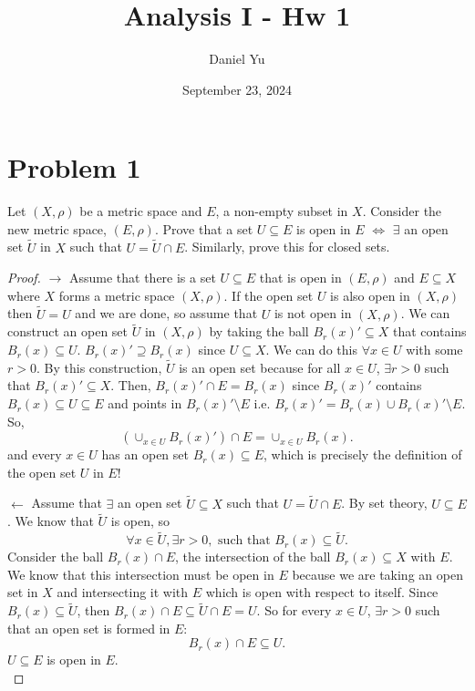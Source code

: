 \documentclass[a4paper]{article}
\title{\Huge{Analysis I - Hw 1}}
\author{\huge{Daniel Yu}}
\date{September 23, 2024}
\begin{document}
\maketitle
\newpage%
\pagebreak

\section{Problem 1}
Let $(X,\rho)$ be a metric space and  $E$, a non-empty subset in $X$. Consider the new metric space,
$(E,\rho)$. Prove that a set $U \subseteq E$ is open in $E$ $\iff$ $\exists $ an open set $\tilde{U}$ in $X$ 
such that  $U = \tilde{U} \cap E$. Similarly, prove this for closed sets.

\begin{proof}
  $\to$ Assume that there is a set $U \subseteq E$ that is open in  $(E, \rho)$ and  $E \subseteq X$  where  $X$ forms a metric space  $(X, \rho)$. If the open set  $U$ is also open in  $(X, \rho)$ then $\tilde{U} = U$ and we are done, so assume that  $U$ is not open in  $(X, \rho)$. We can construct an open set $\tilde{U}$ in $(X, \rho)$ by taking the ball  $B_r(x)' \subseteq X$ that contains  $B_r(x) \subseteq U$. $B_r(x)' \supseteq B_r(x)$ since $U \subseteq X$. We can do this $\forall x \in U$ with some $r > 0$. By this construction,  $\tilde{U}$ is an open set because for all  $x \in U$,  $\exists r > 0$ such that $B_r(x)' \subseteq X$. Then, $B_r(x)' \cap E = B_r(x)$ since $B_r(x)'$ contains $B_r(x) \subseteq U \subseteq E$ and points in $B_r(x)' \setminus E$ i.e. $B_r(x)' = B_r(x) \cup B_r(x)' \setminus E$. So, 
   \[
     (\cup_{x \in U} B_r(x)') \cap E = \cup_{x \in U} B_r(x)  
   .\] 
 and every $x \in U$ has an open set  $B_r(x)\subseteq E$, which is precisely the definition of the open set $U$ in $E$! 

$\leftarrow$ Assume that  $\exists $ an open set $\tilde{U} \subseteq X$ such that $U = \tilde{U} \cap E$. 
By set theory, $U \subseteq E$. We know that $\tilde{U}$ is open, so 
\[
  \forall x \in \tilde{U}, \exists r > 0, \text{ such that } B_r(x) \subseteq \tilde{U} 
.\] 
Consider the ball  $B_r(x) \cap E$, the intersection of the ball  $B_r(x) \subseteq X$ with $E$. We know that 
this intersection must be open in $E$ because we are taking an open set in $X$ and intersecting it with
$E$ which is open with respect to itself. Since $B_r(x) \subseteq \tilde{U}$, then 
$B_r(x) \cap E \subseteq \tilde{U} \cap E = U$.  So for every $x \in U$, $\exists  r > 0$
such that an open set is formed in $E$:
 \[
   B_r(x) \cap E \subseteq U
.\] 
$U \subseteq E$ is open in $E$. \\



\end{proof}
\end{document}
